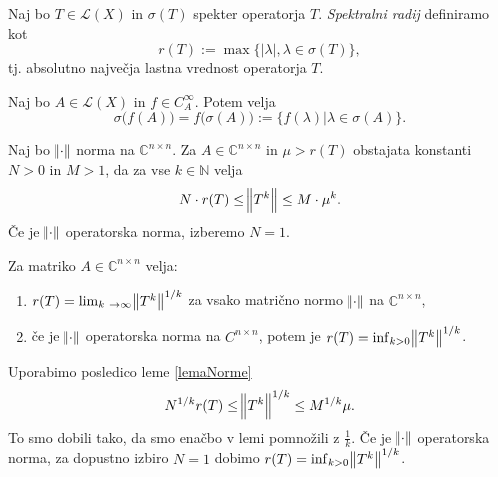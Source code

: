 \documentclass[mat1]{fmfdelo}
\newcommand{\N}{\mathbb N}
\newcommand{\C}{\mathbb C}
\begin{document}
\begin{definicija}
    Naj bo $T \in \mathcal{L}(X)$ in $\sigma(T)$ spekter operatorja $T$. \emph{Spektralni radij} definiramo kot
    \begin{equation}
        r(T) := \max \{|\lambda|, \lambda \in \sigma(T)\},
    \end{equation}
    tj. absolutno največja lastna vrednost operatorja $T$.
\end{definicija}

\begin{izrek} \label{izrekOPreslikaviSpektra}
    Naj bo $A \in \mathcal{L}(X)$ in $f \in C_A^\infty$. Potem velja
    \begin{equation}
        \sigma\big(f(A)\big) = f\big(\sigma(A)\big) := \{f(\lambda) | \lambda \in \sigma(A)\}.
    \end{equation}
\end{izrek}

\begin{lema}\label{lemaNorme}
    Naj bo $\norm{\cdot}$ norma na $\C^{n \times n}$. Za $A \in \C^{n \times n}$ in $\mu > r(T)$ obstajata konstanti $N > 0$ in $M > 1$, da za vse $k \in \N$ velja
    \begin{equation}
        N \cdot r(T) \leq \norm{T^k} \leq M \cdot \mu^k.
    \end{equation}
    Če je $\norm{\cdot}$ operatorska norma, izberemo $N = 1$.
\end{lema}

\begin{trditev} 
    Za matriko $A \in \C^{n \times n}$ velja:
    \begin{enumerate}
        \item $r(T) = \lim_{k \rightarrow \infty} \norm{T^k}^{1/k}$ za vsako matrično normo $\norm{\cdot}$ na $\C^{n \times n}$,
        \item če je $\norm{\cdot}$ operatorska norma na $C^{n \times n}$, potem je $r(T) = \inf_{k > 0} \norm{T^k}^{1/k}$.
    \end{enumerate}
\end{trditev}

\begin{dokaz}
    Uporabimo posledico leme \ref{lemaNorme}
    \begin{equation*}
        N^{1/k} r(T) \leq \norm{T^k}^{1/k} \leq M^{1/k} \mu.
    \end{equation*}
    To smo dobili tako, da smo enačbo v lemi pomnožili z $\frac{1}{k}$. Če je $\norm{\cdot}$ operatorska norma, za dopustno izbiro $N = 1$ dobimo $r(T) = \inf_{k > 0} \norm{T^k}^{1/k}$.
\end{dokaz}
\end{document}

